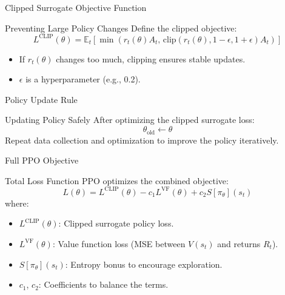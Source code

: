 \documentclass[aspectratio=169,xcolor=dvipsnames,svgnames,x11names,fleqn]{beamer}
\begin{document}
\begin{frame}{Clipped Surrogate Objective Function}
    \begin{tblock}{Preventing Large Policy Changes}
        Define the clipped objective:
        \[
        L^{\text{CLIP}}(\theta) = \mathbb{E}_t \left[ \min\left( r_t(\theta) A_t, \, \text{clip}(r_t(\theta), 1 - \epsilon, 1 + \epsilon) A_t \right) \right]
        \]
        \vspace{0.2cm}
        \begin{itemize}
            \item If $r_t(\theta)$ changes too much, clipping ensures stable updates.
            \item $\epsilon$ is a hyperparameter (e.g., 0.2).
        \end{itemize}
    \end{tblock}
    \end{frame}

    \begin{frame}{Policy Update Rule}
        \begin{tblock}{Updating Policy Safely}
            After optimizing the clipped surrogate loss:
            \[
            \theta_{\text{old}} \leftarrow \theta
            \]
            \vspace{0.3cm}
            Repeat data collection and optimization to improve the policy iteratively.
        \end{tblock}
        \end{frame}

        \begin{frame}{Full PPO Objective}
            \begin{tblock}{Total Loss Function}
                PPO optimizes the combined objective:
                \[
                L(\theta) = L^{\text{CLIP}}(\theta) - c_1 L^{\text{VF}}(\theta) + c_2 S[\pi_\theta](s_t)
                \]
                where:
                \begin{itemize}
                    \item $L^{\text{CLIP}}(\theta)$: Clipped surrogate policy loss.
                    \item $L^{\text{VF}}(\theta)$: Value function loss (MSE between $V(s_t)$ and returns $R_t$).
                    \item $S[\pi_\theta](s_t)$: Entropy bonus to encourage exploration.
                    \item $c_1$, $c_2$: Coefficients to balance the terms.
                \end{itemize}
            \end{tblock}
            \end{frame}
\end{document}
